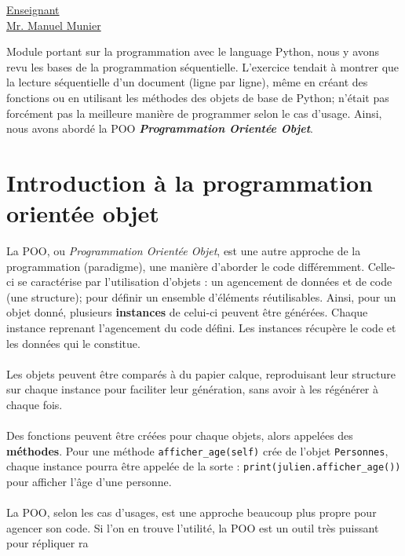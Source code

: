 \renewcommand{\figurename}{}

\vspace*{0.2cm}
      \large
      \href{\@orientadorPagina}{\color{black}Enseignant\\Mr. Manuel Munier}\\
      \normalsize
\vspace*{0.5cm}

Module portant sur la programmation avec le language Python, nous y avons revu les bases de la programmation séquentielle. L'exercice tendait à montrer que la lecture séquentielle d'un document (ligne par ligne), même en créant des fonctions ou en utilisant les méthodes des objets de base de Python; n'était pas forcément pas la meilleure manière de programmer selon le cas d'usage. Ainsi, nous avons abordé la POO \textit{\textbf{Programmation Orientée Objet}}.

\section{Introduction à la programmation orientée objet}

La POO, ou \textit{Programmation Orientée Objet}, est une autre approche de la programmation (paradigme), une manière d'aborder le code différemment. Celle-ci se caractérise par l'utilisation d'objets : un agencement de données et de code (une structure); pour définir un ensemble d'éléments réutilisables. Ainsi, pour un objet donné, plusieurs \textbf{instances} de celui-ci peuvent être générées. Chaque instance reprenant l'agencement du code défini. Les instances récupère le code et les données qui le constitue.
\\ \\
Les objets peuvent être comparés à du papier calque, reproduisant leur structure sur chaque instance pour faciliter leur génération, sans avoir à les régénérer à chaque fois.
\\ \\
Des fonctions peuvent être créées pour chaque objets, alors appelées des \textbf{méthodes}. Pour une méthode \verb|afficher_age(self)| crée de l'objet \verb|Personnes|, chaque instance pourra être appelée de la sorte : \verb|print(julien.afficher_age())| pour afficher l'âge d'une personne.
\\ \\
La POO, selon les cas d'usages, est une approche beaucoup plus propre pour agencer son code. Si l'on en trouve l'utilité, la POO est un outil très puissant pour répliquer ra

